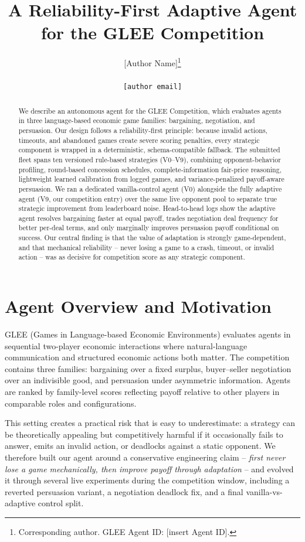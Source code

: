 \documentclass{article}
\title{A Reliability-First Adaptive Agent for the GLEE Competition}
\author{%
  [Author Name]\thanks{Corresponding author. GLEE Agent ID: [insert Agent ID].} \\
  [Affiliation] \\
  \texttt{[author email]}
}
\begin{document}
\maketitle

\begin{abstract}
We describe an autonomous agent for the GLEE Competition, which evaluates agents in three language-based economic game families: bargaining, negotiation, and persuasion. Our design follows a reliability-first principle: because invalid actions, timeouts, and abandoned games create severe scoring penalties, every strategic component is wrapped in a deterministic, schema-compatible fallback. The submitted fleet spans ten versioned rule-based strategies (V0--V9), combining opponent-behavior profiling, round-based concession schedules, complete-information fair-price reasoning, lightweight learned calibration from logged games, and variance-penalized payoff-aware persuasion. We ran a dedicated vanilla-control agent (V0) alongside the fully adaptive agent (V9, our competition entry) over the same live opponent pool to separate true strategic improvement from leaderboard noise. Head-to-head logs show the adaptive agent resolves bargaining faster at equal payoff, trades negotiation deal frequency for better per-deal terms, and only marginally improves persuasion payoff conditional on success. Our central finding is that the value of adaptation is strongly game-dependent, and that mechanical reliability -- never losing a game to a crash, timeout, or invalid action -- was as decisive for competition score as any strategic component.
\end{abstract}

\section{Agent Overview and Motivation}
\label{sec:intro}

GLEE (Games in Language-based Economic Environments) evaluates agents in sequential two-player economic interactions where natural-language communication and structured economic actions both matter. The competition contains three families: bargaining over a fixed surplus, buyer--seller negotiation over an indivisible good, and persuasion under asymmetric information. Agents are ranked by family-level scores reflecting payoff relative to other players in comparable roles and configurations.

This setting creates a practical risk that is easy to underestimate: a strategy can be theoretically appealing but competitively harmful if it occasionally fails to answer, emits an invalid action, or deadlocks against a static opponent. We therefore built our agent around a conservative engineering claim -- \emph{first never lose a game mechanically, then improve payoff through adaptation} -- and evolved it through several live experiments during the competition window, including a reverted persuasion variant, a negotiation deadlock fix, and a final vanilla-vs-adaptive control split.
\end{document}
